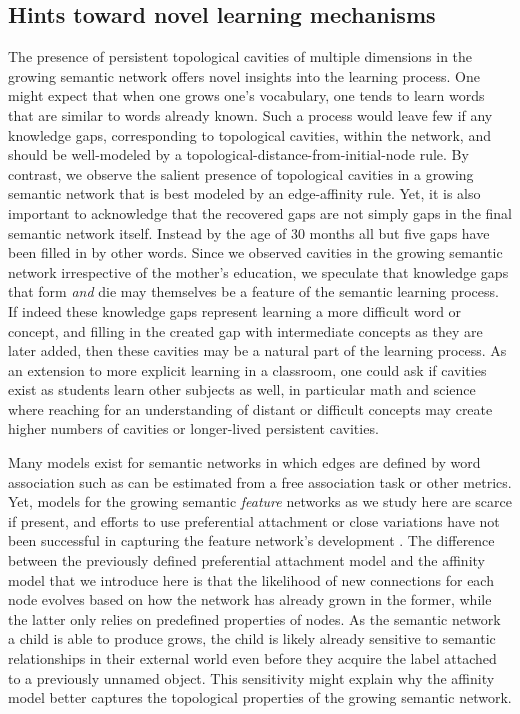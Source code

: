\documentclass{article}
\begin{document}
\subsection*{Hints toward novel learning mechanisms}

The presence of persistent topological cavities of multiple dimensions in the growing semantic network offers novel insights into the learning process. One might expect that when one grows one's vocabulary, one tends to learn words that are similar to words already known. Such a process would leave few if any knowledge gaps, corresponding to topological cavities, within the network, and should be well-modeled by a topological-distance-from-initial-node rule. By contrast, we observe the salient presence of topological cavities in a growing semantic network that is best modeled by an edge-affinity rule. Yet, it is also important to acknowledge that the recovered gaps are not simply gaps in the final semantic network itself. Instead by the age of 30 months all but five gaps have been filled in by other words. Since we observed cavities in the growing semantic network irrespective of the mother's education, we speculate that knowledge gaps that form \emph{and} die may themselves be a feature of the semantic learning process. If indeed these knowledge gaps represent learning a more difficult word or concept, and filling in the created gap with intermediate concepts as they are later added, then these cavities may be a natural part of the learning process. As an extension to more explicit learning in a classroom, one could ask if cavities exist as students learn other subjects as well, in particular math and science where reaching for an understanding of distant or difficult concepts may create higher numbers of cavities or longer-lived persistent cavities.

Many models exist for semantic networks in which edges are defined by word association such as can be estimated from a free association task or other metrics. Yet, models for the growing semantic \emph{feature} networks as we study here are scarce if present, and efforts to use preferential attachment or close variations have not been successful in capturing the feature network's development \cite{hills2009longitudinal}. The difference between the previously defined preferential attachment model and the affinity model that we introduce here is that the likelihood of new connections for each node evolves based on how the network has already grown in the former, while the latter only relies on predefined properties of nodes. As the semantic network a child is able to produce grows, the child is likely already sensitive to semantic relationships in their external world even before they acquire the label attached to a previously unnamed object. This sensitivity might explain why the affinity model better captures the topological properties of the growing semantic network.
\end{document}
